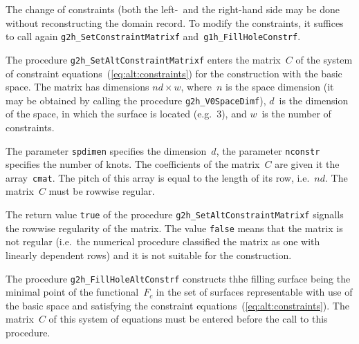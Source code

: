 The change of constraints (both the left-~and the right-hand side
may be done without reconstructing the domain record. To modify the constraints,
it suffices to call again \texttt{g2h\_SetConstraintMatrixf}
and~\texttt{g1h\_FillHoleConstrf}.

\vspace{\bigskipamount}
\begin{sloppypar}
The procedure \texttt{g2h\_SetAltConstraintMatrixf} enters the matrix~$C$
of the system of constraint equations~(\ref{eq:alt:constraints})
for the construction with the basic space. The matrix has dimensions $nd\times w$,
where~$n$ is the space dimension (it may be obtained by calling the procedure
\texttt{g2h\_V0SpaceDimf}), $d$~is the dimension of the space, in which
the surface is located (e.g.~$3$), and $w$~is the number of constraints.%
\end{sloppypar}

The parameter \texttt{spdimen} specifies the dimension~$d$, the parameter
\texttt{nconstr} specifies the number of knots. The coefficients of the matrix~$C$
are given it the array~\texttt{cmat}. The pitch of this array is
equal to the length of its row, i.e.~$nd$. The matrix~$C$ must be
rowwise regular.

The return value \texttt{true} of the procedure
\texttt{g2h\_SetAltConstraintMatrixf} signalls the rowwise regularity of the
matrix. The value \texttt{false} means that the matrix is not regular
(i.e.\ the numerical procedure classified the matrix as one with linearly dependent
rows) and it is not suitable for the construction.

\vspace{\bigskipamount}
\begin{sloppypar}
The procedure \texttt{g2h\_FillHoleAltConstrf} constructs thhe filling surface
being the minimal point of the functional~$F_c$ in the set of surfaces
representable with use of the basic space and satisfying the constraint
equations~(\ref{eq:alt:constraints}).  
The matrix~$C$ of this system of equations must be entered before the call to this
procedure.%
\end{sloppypar}

